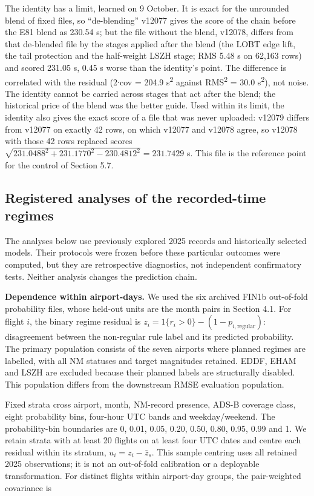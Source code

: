 \documentclass[11pt,a4paper]{article}
\begin{document}
The identity has a limit, learned on 9 October. It is exact for the unrounded blend of fixed files, so ``de-blending'' v12077 gives the score of the chain before the E81 blend as 230.54 s; but the file without the blend, v12078, differs from that de-blended file by the stages applied after the blend (the LOBT edge lift, the tail protection and the half-weight LSZH stage; RMS 5.48 s on 62,163 rows) and scored 231.05 s, 0.45 s worse than the identity's point. The difference is correlated with the residual (2$\cdot$cov = 204.9 s\textsuperscript{2} against RMS\textsuperscript{2} = 30.0 s\textsuperscript{2}), not noise. The identity cannot be carried across stages that act after the blend; the historical price of the blend was the better guide. Used within its limit, the identity also gives the exact score of a file that was never uploaded: v12079 differs from v12077 on exactly 42 rows, on which v12077 and v12078 agree, so v12078 with those 42 rows replaced scores \(\sqrt{231.0488^2 + 231.1770^2 - 230.4812^2} = 231.7429\) s. This file is the reference point for the control of Section 5.7.

\subsection{Registered analyses of the recorded-time regimes}\label{registered-analyses-of-the-recorded-time-regimes}

The analyses below use previously explored 2025 records and historically selected models. Their protocols were frozen before these particular outcomes were computed, but they are retrospective diagnostics, not independent confirmatory tests. Neither analysis changes the prediction chain.

\textbf{Dependence within airport-days.} We used the six archived FIN1b out-of-fold probability files, whose held-out units are the month pairs in Section 4.1. For flight \(i\), the binary regime residual is \(z_i = 1\{r_i > 0\} - (1-p_{i,\mathrm{regular}})\): disagreement between the non-regular rule label and its predicted probability. The primary population consists of the seven airports where planned regimes are labelled, with all NM statuses and target magnitudes retained. EDDF, EHAM and LSZH are excluded because their planned labels are structurally disabled. This population differs from the downstream RMSE evaluation population.

Fixed strata cross airport, month, NM-record presence, ADS-B coverage class, eight probability bins, four-hour UTC bands and weekday/weekend. The probability-bin boundaries are 0, 0.01, 0.05, 0.20, 0.50, 0.80, 0.95, 0.99 and 1. We retain strata with at least 20 flights on at least four UTC dates and centre each residual within its stratum, \(u_i=z_i-\bar z_s\). This sample centring uses all retained 2025 observations; it is not an out-of-fold calibration or a deployable transformation. For distinct flights within airport-day groups, the pair-weighted covariance is
\end{document}
